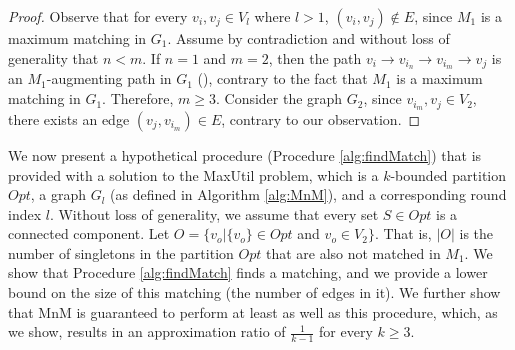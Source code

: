 \documentclass[sigconf,anonymous]{aamas}
\begin{document}
\begin{proof}
Observe that for every $v_i, v_j \in V_l$ where $l>1$, $(v_i,v_j) \notin E$, since $M_1$ is a maximum matching in $G_1$.
Assume by contradiction and without loss of generality that $n<m$. If $n=1$ and $m=2$, then the path $v_i \rightarrow v_{i_n} \rightarrow v_{i_m} \rightarrow v_j$ is an $M_1$-augmenting path in $G_1$ (\cite{edmons1965paths}), contrary to the fact that $M_1$ is a maximum matching in $G_1$. Therefore, $m\geq 3$. Consider the graph $G_2$, since $v_{i_m}, v_j \in V_2$, there exists an edge $(v_j, v_{i_m}) \in E$, contrary to our observation.







\end{proof}





We now present a hypothetical procedure (Procedure \ref{alg:findMatch}) that is provided with a solution to the MaxUtil problem, which is a $k$-bounded partition $Opt$, a graph $G_l$ (as defined in Algorithm \ref{alg:MnM}), and a corresponding round index $l$. Without loss of generality, we assume that every set $S \in Opt$ is a connected component. %
%
%
Let $O=\{v_o | \{v_o\} \in Opt$ and $v_o \in V_2\}$. That is, $|O|$ is the number of singletons in the partition $Opt$ that are also not matched in $M_1$. %
%
We show that Procedure \ref{alg:findMatch} finds a matching, and we provide a lower bound on the size of this matching (the number of edges in it). %
We further show that MnM is guaranteed to perform at least as well as this procedure, which, as we show, results in an approximation ratio of $\frac{1}{k-1}$ for every $k\geq3$.
\end{document}
